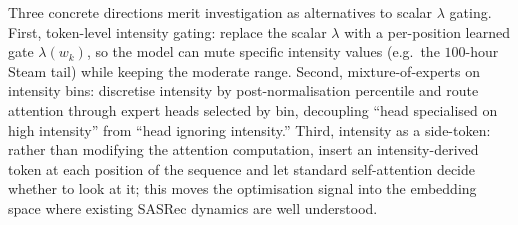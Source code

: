 Three concrete directions merit investigation as alternatives to scalar $\lambda$ gating.
First, token-level intensity gating: replace the scalar
$\lambda$ with a per-position learned gate $\lambda(w_k)$, so the
model can mute specific intensity values (e.g.\ the $100$-hour Steam
tail) while keeping the moderate range. Second,
mixture-of-experts on intensity bins: discretise intensity by
post-normalisation percentile and route attention through expert
heads selected by bin, decoupling ``head specialised on high
intensity'' from ``head ignoring intensity.'' Third, intensity
as a side-token: rather than modifying the attention computation,
insert an intensity-derived token at each position of the sequence
and let standard self-attention decide whether to look at it; this
moves the optimisation signal into the embedding space where existing
SASRec dynamics are well understood.

